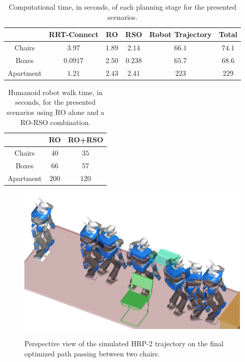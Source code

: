 \begin{table}
\centering
\begin{tabular}{c|c|c|c|c|c|}
  \cline{2-6}
  & RRT-Connect & RO & RSO & Robot Trajectory & Total\\
  \hline
  \multicolumn{1}{|c|}{Chairs} & $3.97$ & $1.89$ & $2.14$ & $66.1$ & $74.1$\\
  \hline
  \multicolumn{1}{|c|}{Boxes} & $0.0917$ & $2.50$ & $0.238$ & $65.7$ & $68.6$\\
  \hline
  \multicolumn{1}{|c|}{Apartment} & $1.21$ & $2.43$ & $2.41$ & $223$ & $229$ \\
  \hline
\end{tabular}
\caption[Computation time of each planning stage.]{Computational time,
  in seconds, of each planning stage for the presented scenarios.}
\label{tab:chap1-computation-time}
\end{table}

\begin{table}
\centering
\begin{tabular}{c|c|c|}
  \cline{2-3}
  & RO & RO+RSO \\
  \hline
  \multicolumn{1}{|c|}{Chairs} & $40$ & $35$ \\
  \hline
  \multicolumn{1}{|c|}{Boxes} & $66$ & $57$ \\
  \hline
  \multicolumn{1}{|c|}{Apartment} & $200$ & $120$ \\
  \hline
\end{tabular}
\caption[Humanoid robot walk time.]{Humanoid robot walk time, in
  seconds, for the presented scenarios using RO alone and a RO-RSO
  combination.}
\label{tab:chap1-walk-time}
\end{table}

\begin{figure}
  \centering
      {\includegraphics[width = 0.8\linewidth]
        {src/chap1-path-optimization/chairs-hash-optim-perspective-hrp2.png}}
      \caption[HRP-2 trajectory on the optimized path passing between
        two chairs.]{Perspective view of the simulated HRP-2
        trajectory on the final optimized path passing between two
        chairs.}
      \label{fig:chap1-chairs-hash-optim-perspective-hrp2}
\end{figure}

